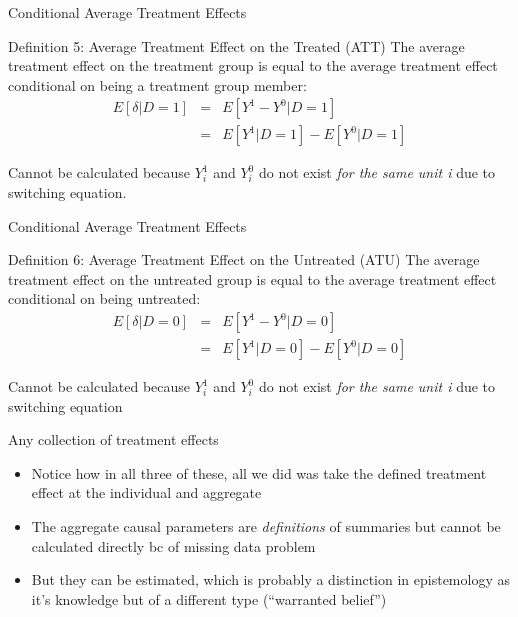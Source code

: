 \documentclass{beamer}
\begin{document}
\begin{frame}{Conditional Average Treatment Effects}


  \begin{block}{Definition 5: Average Treatment Effect on the Treated (ATT)}
    The average treatment effect on the treatment group is equal to the average treatment effect conditional on being a treatment group member:
    \begin{eqnarray*}
      E[\delta|D=1]&=&E[Y^1-Y^0|D=1] \nonumber \\
      &=&E[Y^1|D=1]-E[Y^0|D=1]
    \end{eqnarray*}
  \end{block}
  Cannot be calculated because $Y^1_i$ and $Y^0_i$ do not exist \emph{for the same unit i} due to switching equation. 


\end{frame}



\begin{frame}{Conditional Average Treatment Effects}

  \begin{block}{Definition 6: Average Treatment Effect on the Untreated (ATU)}
    The average treatment effect on the untreated group is equal to the average treatment effect conditional on being untreated:
    \begin{eqnarray*}
      E[\delta|D=0]&=&E[Y^1-Y^0|D=0] \nonumber \\
      &=&E[Y^1|D=0]-E[Y^0|D=0]
    \end{eqnarray*}
  \end{block}
  Cannot be calculated because $Y^1_i$ and $Y^0_i$ do not exist \emph{for the same unit i} due to switching equation

\end{frame}


\begin{frame}{Any collection of treatment effects}

  \begin{itemize}
	\item Notice how in all three of these, all we did was take the defined treatment effect at the individual and aggregate
	\item The aggregate causal parameters are \emph{definitions} of summaries but cannot be calculated directly bc of missing data problem
	\item But they can be estimated, which is probably a distinction in epistemology as it's knowledge but of a different type (``warranted belief'')
  \end{itemize}

\end{frame}
\end{document}
